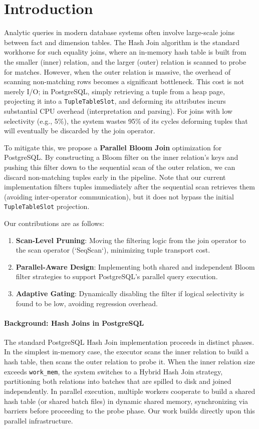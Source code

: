 \documentclass[sigconf,nonacm]{acmart}
\begin{document}
\section{Introduction}
Analytic queries in modern database systems often involve large-scale joins between fact and dimension tables. The Hash Join algorithm is the standard workhorse for such equality joins, where an in-memory hash table is built from the smaller (inner) relation, and the larger (outer) relation is scanned to probe for matches. However, when the outer relation is massive, the overhead of scanning non-matching rows becomes a significant bottleneck. This cost is not merely I/O; in PostgreSQL, simply retrieving a tuple from a heap page, projecting it into a \texttt{TupleTableSlot}, and deforming its attributes incurs substantial CPU overhead (interpretation and parsing). For joins with low selectivity (e.g., 5\%), the system wastes 95\% of its cycles deforming tuples that will eventually be discarded by the join operator.

To mitigate this, we propose a \textbf{Parallel Bloom Join} optimization for PostgreSQL. By constructing a Bloom filter on the inner relation's keys and pushing this filter down to the sequential scan of the outer relation, we can discard non-matching tuples early in the pipeline. Note that our current implementation filters tuples immediately after the sequential scan retrieves them (avoiding inter-operator communication), but it does not bypass the initial \texttt{TupleTableSlot} projection.

Our contributions are as follows:
\begin{enumerate}
    \item \textbf{Scan-Level Pruning}: Moving the filtering logic from the join operator to the scan operator (`SeqScan`), minimizing tuple transport cost.
    \item \textbf{Parallel-Aware Design}: Implementing both shared and independent Bloom filter strategies to support PostgreSQL's parallel query execution.
    \item \textbf{Adaptive Gating}: Dynamically disabling the filter if logical selectivity is found to be low, avoiding regression overhead.
\end{enumerate}

\paragraph{Background: Hash Joins in PostgreSQL}
The standard PostgreSQL Hash Join implementation proceeds in distinct phases. In the simplest in-memory case, the executor scans the inner relation to build a hash table, then scans the outer relation to probe it. When the inner relation size exceeds \texttt{work\_mem}, the system switches to a Hybrid Hash Join strategy, partitioning both relations into batches that are spilled to disk and joined independently. In parallel execution, multiple workers cooperate to build a shared hash table (or shared batch files) in dynamic shared memory, synchronizing via barriers before proceeding to the probe phase. Our work builds directly upon this parallel infrastructure.
\end{document}
